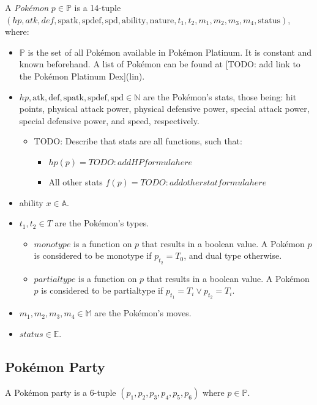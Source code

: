 A \emph{Pokémon} $p \in \mathbb{P}$ is a 14-tuple $(hp, atk, def, \text{spatk}, \text{spdef}, \text{spd}, \text{ability}, \text{nature}, t_1, t_2, m_1, m_2, m_3, m_4, \text{status})$, where:
\begin{itemize}
    \item $\mathbb{P}$ is the set of all Pokémon available in Pokémon Platinum. It is constant and known beforehand. A list of Pokémon can be found at [TODO: add link to the Pokémon Platinum Dex](lin).
    \item $hp, \text{atk}, \text{def}, \text{spatk}, \text{spdef}, \text{spd} \in \mathbb{N}$ are the Pokémon's stats, those being: hit points, physical attack power, physical defensive power, special attack power, special defensive power, and speed, respectively.
    \begin{itemize}
        \item TODO: Describe that stats are all functions, such that:
            \begin{itemize}
                \item $hp(p) = TODO: add HP formula here$
                \item All other stats $f(p) = TODO: add other stat formula here$
            \end{itemize}
    \end{itemize}
    \item ability $x \in \mathbb{A}$.
    \item $t_1, t_2 \in T$ are the Pokémon's types.
    \begin{itemize}
        \item $monotype$ is a function on $p$ that results in a boolean value. A Pokémon $p$ is considered to be monotype if $p_{t_2} = T_0$, and dual type otherwise.
        \item $partialtype$ is a function on $p$ that results in a boolean value. A Pokémon $p$ is considered to be partialtype if $p_{t_1} = T_i \lor p_{t_2} = T_i$.
    \end{itemize}
    \item $m_1, m_2, m_3, m_4 \in \mathbb{M}$ are the Pokémon's moves.
    \item $status \in \mathbb{E}$.
\end{itemize}

\subsection{Pokémon Party}

A Pokémon party is a 6-tuple $(p_1, p_2, p_3, p_4, p_5, p_6)$ where $p \in \mathbb{P}$.

